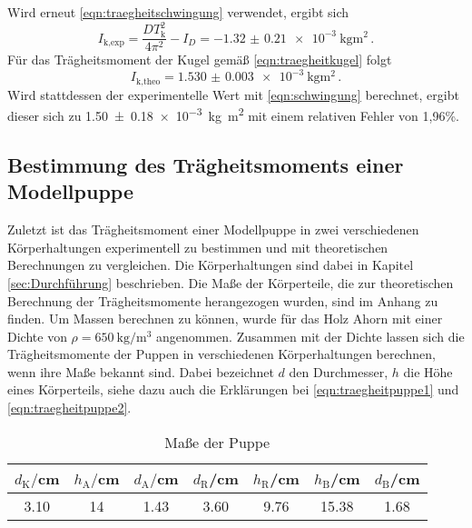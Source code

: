Wird erneut \eqref{eqn:traegheitschwingung} verwendet, ergibt sich
\begin{equation}
  I_{\text{k,exp}} = \frac{DT_{\text{k}}^2}{4\pi^2}-I_D = \SI{-1.32(021)e-3}{\kilogram\meter\squared}\,.
\end{equation}
Für das Trägheitsmoment der Kugel gemäß \eqref{eqn:traegheitkugel} folgt
\begin{equation}
  I_{\text{k,theo}} = \SI{1.530(0003)e-3}{\kilogram\meter\squared}\,.
\end{equation}
Wird stattdessen der experimentelle Wert mit \eqref{eqn:schwingung} berechnet,
ergibt dieser sich zu \SI{1.50(018)e-3}{\kilogram\meter\squared} mit einem relativen
Fehler von 1,96\%.

\subsection{Bestimmung des Trägheitsmoments einer Modellpuppe}
Zuletzt ist das Trägheitsmoment einer Modellpuppe in zwei verschiedenen
Körperhaltungen experimentell zu bestimmen und mit theoretischen Berechnungen zu
vergleichen. Die Körperhaltungen sind dabei in Kapitel \ref{sec:Durchführung} beschrieben.
Die Maße der Körperteile, die zur theoretischen Berechnung der Trägheitsmomente
herangezogen wurden, sind im Anhang zu finden. Um Massen berechnen zu können,
wurde für das Holz Ahorn mit einer Dichte von $\rho=\SI{650}{\kilogram\per\meter\cubed}$
\cite{Ahorn} angenommen.
Zusammen mit der Dichte lassen sich die Trägheitsmomente der Puppen in
verschiedenen Körperhaltungen berechnen, wenn ihre Maße bekannt sind. Dabei
bezeichnet $d$ den Durchmesser, $h$ die Höhe eines Körperteils, siehe dazu auch
die Erklärungen bei \eqref{eqn:traegheitpuppe1} und \eqref{eqn:traegheitpuppe2}.
\begin{table}
\centering
\caption{Maße der Puppe}
\label{tab:maßepuppe}
\begin{tabular}{c c c c c c c}
\toprule
$d_{\text{K}}/$cm & $h_{\text{A}}/$cm & $d_{\text{A}}/$cm & $d_{\text{R}}$/cm &
$h_{\text{R}}$/cm & $h_{\text{B}}$/cm & $d_{\text{B}}$/cm \\
\midrule
3.10 & 14 & 1.43 & 3.60 & 9.76 & 15.38 & 1.68\\
\bottomrule
\end{tabular}
\end{table}
